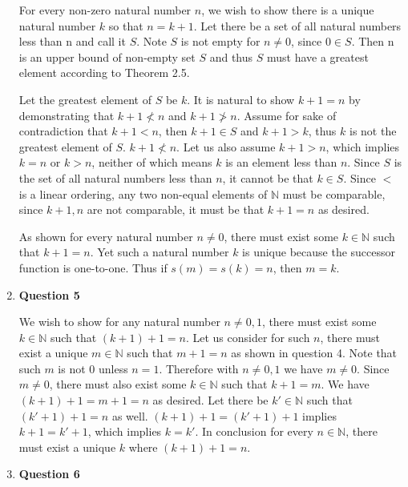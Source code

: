 \documentclass{article}
\begin{document}
\begin{enumerate}
	For every non-zero natural number $n$, we wish to show there is a unique natural number $k$ so that $n = k + 1$. Let there be a set of all natural numbers less than n and call it $S$. Note $S$ is not empty for $n \neq 0$, since $0 \in S$. Then n is an upper bound of non-empty set $S$ and thus $S$ must have a greatest element according to Theorem 2.5. 
	
	\medskip
	 Let the greatest element of $S$ be $k$. It is natural to show $k + 1 = n$ by demonstrating that $k + 1 \not < n$ and $k + 1 \not > n$. Assume for sake of contradiction that $k + 1 < n$, then $k + 1 \in S$ and $k + 1 > k$, thus $k$ is not the greatest element of $S$. $k + 1 \not < n$. 
	 Let us also assume $k + 1 > n$, which implies $k = n$ or $k > n$, neither of which means $k$ is an element less than $n$. Since $S$ is the set of all natural numbers less than $n$, it cannot be that $k \in S$. Since $<$ is a linear ordering, any two non-equal elements of $\mathbb{N}$ must be comparable, since $k + 1,n$ are not comparable, it must be that $k + 1 = n$ as desired.
	 
	 \medskip
	 As shown for every natural number $n \neq 0$, there must exist some $k \in \mathbb{N}$ such that $k + 1 = n$. Yet such a natural number $k$ is unique because the successor function is one-to-one. Thus if $s(m) = s(k) = n$, then $m = k$. 
	 
	 \item \textbf{Question 5}
	 \medskip
	 
	 We wish to show for any natural number $n \neq 0,1$, there must exist some $k \in \mathbb{N}$ such that $(k + 1) + 1 = n$. Let us consider for such $n$, there must exist a unique $m \in \mathbb{N}$ such that $m + 1 = n$ as shown in question 4. Note that such $m$ is not 0 unless $n = 1$. Therefore with $n \neq 0,1$ we have $m \neq 0$. Since $m \neq 0$, there must also exist some $k \in \mathbb{N}$ such that $k + 1 = m$. We have $(k + 1) + 1 = m + 1 = n$ as desired. Let there be $k' \in \mathbb{N}$ such that $(k' + 1) + 1 = n$ as well. $(k + 1) + 1 = (k' + 1) + 1$ implies $k + 1 = k' + 1$, which implies $k = k'$. In conclusion for every $n \in \mathbb{N}$, there must exist a unique $k$ where $(k + 1) + 1 = n$.
	 
	 \item \textbf{Question 6}
	 \medskip
	 

\end{enumerate}
\end{document}
